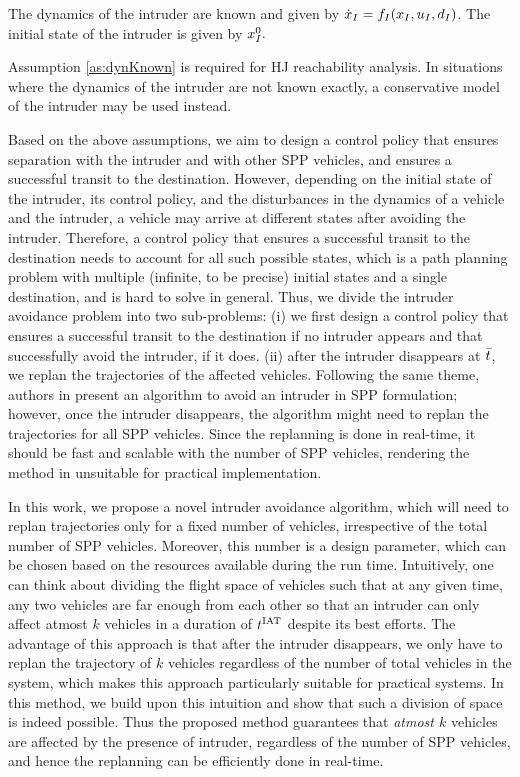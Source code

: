 \begin{assumption}
\label{as:dynKnown}
The dynamics of the intruder are known and given by $\dot{x}_I = f_I(x_I, u_I, d_I)$. The initial state of the intruder is given by $x_{I}^0.$
\end{assumption}

Assumption \ref{as:dynKnown} is required for HJ reachability analysis. In situations where the dynamics of the intruder are not known exactly, a conservative model of the intruder may be used instead.

Based on the above assumptions, we aim to design a control policy that ensures separation with the intruder and with other SPP vehicles, and ensures a successful transit to the destination. However, depending on the initial state of the intruder, its control policy, and the disturbances in the dynamics of a vehicle and the intruder, a vehicle may arrive at different states after avoiding the intruder. Therefore, a control policy that ensures a successful transit to the destination needs to account for all such possible states, which is a path planning problem with multiple (infinite, to be precise) initial states and a single destination, and is hard to solve in general. Thus, we divide the intruder avoidance problem into two sub-problems: (i) we first design a control policy that ensures a successful transit to the destination if no intruder appears and that successfully avoid the intruder, if it does. (ii) after the intruder disappears at $\bar{t}$, we replan the trajectories of the affected vehicles. Following the same theme, authors in \cite{} present an algorithm to avoid an intruder in SPP formulation; however, once the intruder disappears, the algorithm might need to replan the trajectories for all SPP vehicles. Since the replanning is done in real-time, it should be fast and scalable with the number of SPP vehicles, rendering the method in \cite{} unsuitable for practical implementation.  

In this work, we propose a novel intruder avoidance algorithm, which will need to replan trajectories only for a fixed number of vehicles, irrespective of the total number of SPP vehicles. Moreover, this number is a design parameter, which can be chosen based on the resources available during the run time. Intuitively, one can think about dividing the flight space of vehicles such that at any given time, any two vehicles are far enough from each other so that an intruder can only affect atmost $k$ vehicles in a duration of $t^\text{IAT}$ despite its best efforts. The advantage of this approach is that after the intruder disappears, we only have to replan the trajectory of $k$ vehicles regardless of the number of total vehicles in the system, which makes this approach particularly suitable for practical systems. In this method, we build upon this intuition and show that such a division of space is indeed possible. Thus the proposed method guarantees that \textit{atmost $k$} vehicles are affected by the presence of intruder, regardless of the number of SPP vehicles, and hence the replanning can be efficiently done in real-time. 

